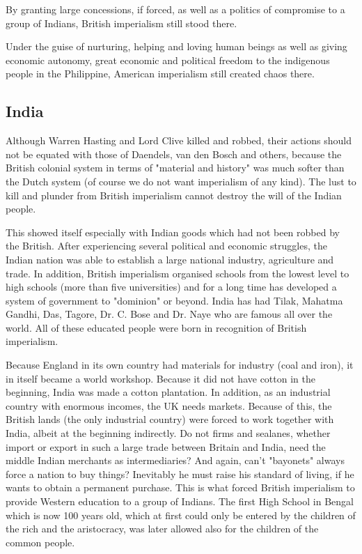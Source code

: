 By granting large concessions, if forced, as well as a politics of compromise to a group of Indians, British imperialism still stood there.\nline

Under the guise of nurturing, helping and loving human beings as well as giving economic 
autonomy, great economic and political freedom to the indigenous people in the Philippine, 
American imperialism still created chaos there.\nline

\subsection{India}

Although Warren Hasting and Lord Clive killed and robbed, 
their actions should not be equated with those of Daendels, van den 
Bosch and others, because the British colonial system in terms of 
"material and history" was much softer than the Dutch system (of course we do not want imperialism of any kind). 
The lust to kill and plunder from British imperialism cannot destroy the will of the Indian people.\nline

This showed itself especially with Indian goods which had not been robbed by the British. 
After experiencing several political and economic struggles, the Indian nation was able to 
establish a large national industry, agriculture and trade. In addition, British imperialism 
organised schools from the lowest level to high schools (more than five universities) 
and for a long time has developed a system of government to "dominion" or beyond. India 
has had Tilak, Mahatma Gandhi, Das, Tagore, Dr. C. Bose and Dr. Naye who are famous all 
over the world. All of these educated people were born in recognition of British imperialism.\nline

Because England in its own country had materials for industry (coal and iron), it in itself 
became a world workshop. Because it did not have cotton in the beginning, India was made a 
cotton plantation. In addition, as an industrial country with enormous incomes, the UK needs 
markets. Because of this, the British lands (the only industrial country) were forced to work 
together with India, albeit at the beginning indirectly. Do not firms and sealanes, whether 
import or export in such a large trade between Britain and India, need the middle Indian 
merchants as intermediaries? And again, can't "bayonets" always force a nation to buy things? 
Inevitably he must raise his standard of living, if he wants to obtain a permanent purchase. 
This is what forced British imperialism to provide Western education to a group of Indians. 
The first High School in Bengal which is now 100 years old, which at first could only be entered 
by the children of the rich and the aristocracy, was later allowed also for the children of the common people.\nline


